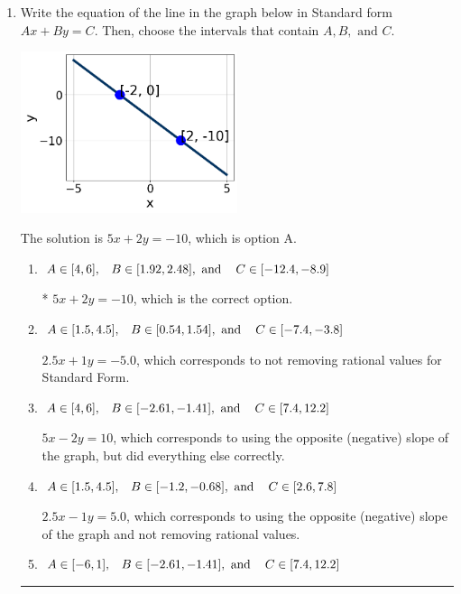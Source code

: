 \documentclass{extbook}[14pt]
\newcommand{\litem}[1]{\item #1

\rule{\textwidth}{0.4pt}}
\begin{document}
\begin{enumerate}\litem{
Write the equation of the line in the graph below in Standard form $Ax+By=C$. Then, choose the intervals that contain $A, B, \text{ and } C$.

\begin{center}
    \includegraphics[width=0.5\textwidth]{../Figures/linearGraphToStandardB.png}
\end{center}


The solution is \( 5x + 2y = -10 \), which is option A.\begin{enumerate}[label=\Alph*.]
\item \( A \in [4, 6], \hspace{3mm} B \in [1.92, 2.48], \text{ and } \hspace{3mm} C \in [-12.4, -8.9] \)

* $5x + 2y = -10$, which is the correct option.
\item \( A \in [1.5, 4.5], \hspace{3mm} B \in [0.54, 1.54], \text{ and } \hspace{3mm} C \in [-7.4, -3.8] \)

 $2.5x + 1y = -5.0$, which corresponds to not removing rational values for Standard Form.
\item \( A \in [4, 6], \hspace{3mm} B \in [-2.61, -1.41], \text{ and } \hspace{3mm} C \in [7.4, 12.2] \)

 $5x - 2y = 10$, which corresponds to using the opposite (negative) slope of the graph, but did everything else correctly.
\item \( A \in [1.5, 4.5], \hspace{3mm} B \in [-1.2, -0.68], \text{ and } \hspace{3mm} C \in [2.6, 7.8] \)

 $2.5x - 1y = 5.0$, which corresponds to using the opposite (negative) slope of the graph and not removing rational values.
\item \( A \in [-6, 1], \hspace{3mm} B \in [-2.61, -1.41], \text{ and } \hspace{3mm} C \in [7.4, 12.2] \)


\end{enumerate}}
\end{enumerate}
\end{document}

